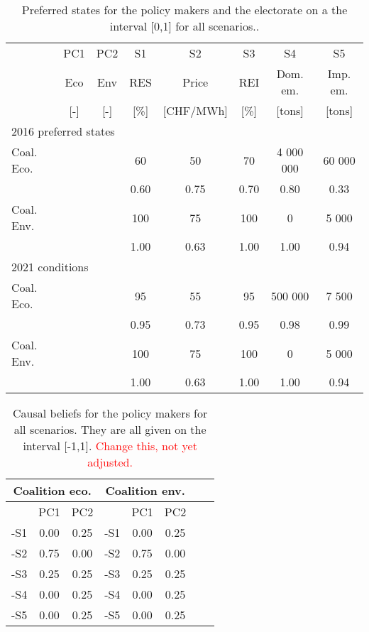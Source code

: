 \documentclass[12pt]{article}
\begin{document}
\begin{table}
\begin{center}
\begin{tabular}{|l|c|c|c|c|c|c|c|} 
\hline
			& PC1 	& PC2	& S1		& S2			& S3		& S4			& S5			\\ 
			&Eco	& Env	& RES	& Price		& REI	& Dom. em.	& Imp. em.	\\
			& [-]		& [-]		& [\%]	& [CHF/MWh]	& [\%]	& [tons]		& [tons]		\\ \hline
\multicolumn{8}{|l|}{2016 preferred states}													\\ \hline
Coal. Eco.		& 		& 		& 60		& 50 			& 70		& 4 000 000	& 60 000 		\\ \hline
			& 		& 		& 0.60	& 0.75 		& 0.70	& 0.80		& 0.33 		\\ \hline
Coal. Env. 	& 		& 		& 100	& 75			& 100	& 0			& 5 000		\\ \hline
			& 		& 		& 1.00	& 0.63		& 1.00	& 1.00		& 0.94 		\\ \hline
\multicolumn{8}{|l|}{2021 conditions}														\\ \hline
Coal. Eco.		& 		& 		& 95		& 55 			& 95		& 500 000		& 7 500 		\\ \hline
			& 		& 		& 0.95	& 0.73		& 0.95 	& 0.98		& 0.99 		\\ \hline
Coal. Env. 	& 		& 		& 100	& 75			& 100	& 0			& 5 000		\\ \hline
			& 		& 		& 1.00	& 0.63		& 1.00	& 1.00		& 0.94 		\\ \hline
\end{tabular}
\end{center}
\caption{Preferred states for the policy makers and the electorate on a the interval [0,1] for all scenarios..}
\label{tab:si_elec_beliefs}
\end{table}

\begin{table}
\begin{center}
\begin{tabular}{ |c|c|c|c| |c|c|c|c|}
 \hline
\multicolumn{3}{|c|}{Coalition eco.}
					& \multicolumn{3}{|c|}{Coalition env.}	\\ \hline \hline
	& PC1	& PC2	&		& PC1	& PC2	\\ \hline
-S1 	& 0.00	& 0.25	& -S1 	& 0.00	& 0.25	\\ \hline
-S2 	& 0.75	& 0.00	& -S2 	& 0.75	& 0.00	\\ \hline
-S3 	& 0.25	& 0.25	& -S3 	& 0.25	& 0.25	\\ \hline
-S4 	& 0.00	& 0.25	& -S4 	& 0.00	& 0.25	\\ \hline
-S5 	& 0.00	& 0.25	& -S5 	& 0.00	& 0.25	\\
 \hline
\end{tabular}
\end{center}
\caption{Causal beliefs for the policy makers for all scenarios. They are all given on the interval [-1,1]. \textcolor{red}{Change this, not yet adjusted.}}
\label{tab:si_elec_causalBeliefs}
\end{table}
\end{document}
